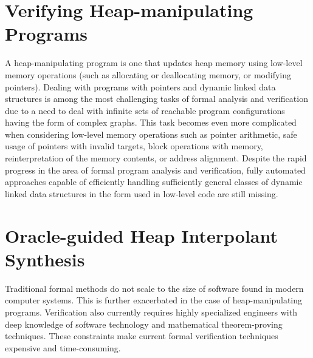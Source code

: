 \section{Verifying Heap-manipulating Programs}
A heap-manipulating program is one that updates heap memory using low-level memory operations (such as allocating or deallocating memory, or modifying pointers). Dealing with programs with pointers and dynamic linked data structures is among the most challenging tasks of formal analysis and verification due to a need to deal with infinite sets of reachable program configurations having the form of complex graphs. This task becomes even more complicated when considering low-level memory operations such as pointer arithmetic, safe usage of pointers with invalid targets, block operations with memory, reinterpretation of the memory contents, or address alignment. Despite the rapid progress in the area of formal program analysis and verification, fully automated approaches capable of efficiently handling sufficiently general classes of dynamic
linked data structures in the form used in low-level code are still missing.

\section{Oracle-guided Heap Interpolant Synthesis}
Traditional formal methods do not scale to the size of software found in modern computer systems. This is further exacerbated in the case of heap-manipulating programs. Verification also currently requires highly specialized engineers with deep knowledge of software technology and mathematical theorem-proving techniques. These constraints make current formal verification techniques expensive and time-consuming.
